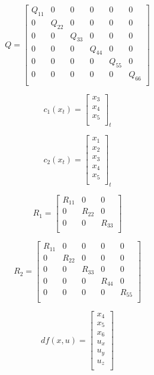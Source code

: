 \documentclass{article}
\begin{document}
\[
	Q= 
	\left[ {\begin{array}{cccccc}
				Q_{11} & 0 & 0 & 0 & 0 & 0\\
				0 & Q_{22} & 0 & 0 & 0 & 0\\
				0 & 0 & Q_{33} & 0 & 0 & 0\\
				0 & 0 & 0 & Q_{44} & 0 & 0\\
				0 & 0 & 0 & 0 & Q_{55} & 0\\
				0 & 0 & 0 & 0 & 0 & Q_{66}\\
	\end{array} } \right]
\]

\[
	c_1(x_t)=
	\left[ {\begin{array}{ccc}
				x_3\\
				x_4\\
				x_5\\
	\end{array} } \right]_t
\]

\[
	c_2(x_t)=
	\left[ {\begin{array}{ccccc}
				x_1\\
				x_2\\
				x_3\\
				x_4\\
				x_5\\
	\end{array} } \right]_t
\]

\[
	R_1=
	\left[ {\begin{array}{ccc}
				R_{11} & 0 & 0\\
				0 & R_{22} & 0\\
				0 & 0 & R_{33}\\
	\end{array} } \right]
\]

\[
	R_2=
	\left[ {\begin{array}{ccccc}
				R_{11} & 0 & 0 & 0 & 0\\
				0 & R_{22} & 0 & 0 & 0\\
				0 & 0 & R_{33} & 0 & 0\\
				0 & 0 & 0 & R_{44} & 0\\
				0 & 0 & 0 & 0 & R_{55}\\
	\end{array} } \right]
\]



\[
	df(x,u)=
	\left[ {\begin{array}{cccccc}
				x_4\\
				x_5\\
				x_6\\
				u_x\\
				u_y\\
				u_z\\
	\end{array} } \right]
\]
\end{document}
